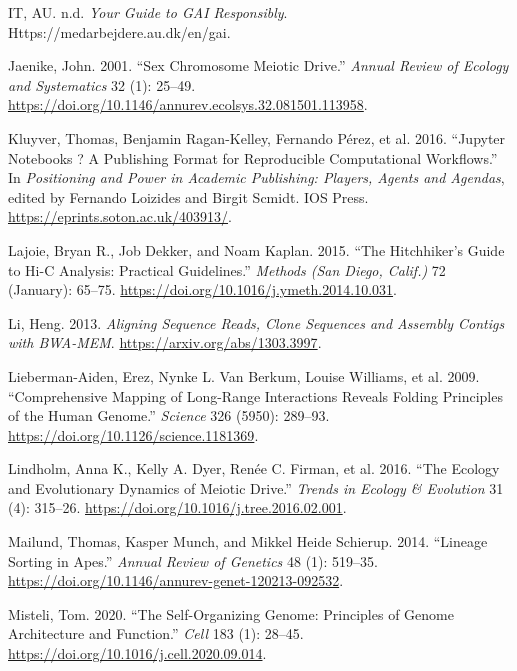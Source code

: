 \documentclass[
  11pt,
  a4paper,
]{scrbook}
\newlength{\cslhangindent}
\newenvironment{CSLReferences}[2] %
 {\begin{list}{}{%
  \setlength{\itemindent}{0pt}
  \setlength{\leftmargin}{0pt}
  \setlength{\parsep}{0pt}
  \ifodd #1
   \setlength{\leftmargin}{\cslhangindent}
   \setlength{\itemindent}{-1\cslhangindent}
  \fi
  \setlength{\itemsep}{#2\baselineskip}}}
 {\end{list}}
\begin{document}
\begin{CSLReferences}{1}{1}
IT, AU. n.d. \emph{Your Guide to {GAI} Responsibly}.
Https://medarbejdere.au.dk/en/gai.

Jaenike, John. 2001. {``Sex {Chromosome Meiotic Drive}.''} \emph{Annual
Review of Ecology and Systematics} 32 (1): 25--49.
\url{https://doi.org/10.1146/annurev.ecolsys.32.081501.113958}.

{Kluyver, Thomas, Benjamin Ragan-Kelley, Fernando Pérez, et al.} 2016.
{``Jupyter Notebooks ? A Publishing Format for Reproducible
Computational Workflows.''} In \emph{Positioning and Power in Academic
Publishing: Players, Agents and Agendas}, edited by Fernando Loizides
and Birgit Scmidt. IOS Press. \url{https://eprints.soton.ac.uk/403913/}.

Lajoie, Bryan R., Job Dekker, and Noam Kaplan. 2015. {``The
{Hitchhiker}'s {Guide} to {Hi-C Analysis}: {Practical} Guidelines.''}
\emph{Methods (San Diego, Calif.)} 72 (January): 65--75.
\url{https://doi.org/10.1016/j.ymeth.2014.10.031}.

Li, Heng. 2013. \emph{Aligning Sequence Reads, Clone Sequences and
Assembly Contigs with BWA-MEM}. \url{https://arxiv.org/abs/1303.3997}.

Lieberman-Aiden, Erez, Nynke L. Van Berkum, Louise Williams, et al.
2009. {``Comprehensive {Mapping} of {Long-Range Interactions Reveals
Folding Principles} of the {Human Genome}.''} \emph{Science} 326 (5950):
289--93. \url{https://doi.org/10.1126/science.1181369}.

Lindholm, Anna K., Kelly A. Dyer, Renée C. Firman, et al. 2016. {``The
{Ecology} and {Evolutionary Dynamics} of {Meiotic Drive}.''}
\emph{Trends in Ecology \& Evolution} 31 (4): 315--26.
\url{https://doi.org/10.1016/j.tree.2016.02.001}.

Mailund, Thomas, Kasper Munch, and Mikkel Heide Schierup. 2014.
{``Lineage {Sorting} in {Apes}.''} \emph{Annual Review of Genetics} 48
(1): 519--35. \url{https://doi.org/10.1146/annurev-genet-120213-092532}.

Misteli, Tom. 2020. {``The {Self-Organizing Genome}: {Principles} of
{Genome Architecture} and {Function}.''} \emph{Cell} 183 (1): 28--45.
\url{https://doi.org/10.1016/j.cell.2020.09.014}.


\end{CSLReferences}
\end{document}

